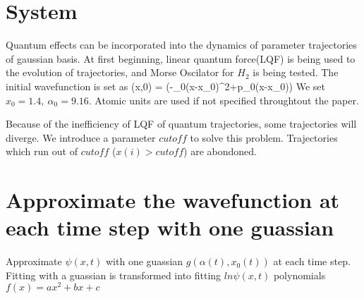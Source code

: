\documentclass[11pt]{article}
\begin{document}
\section{System}
Quantum effects can be incorporated into the dynamics of parameter trajectories of gaussian basis.
At first beginning, linear quantum force(LQF) is being used to the evolution of trajectories, and 
Morse Oscilator for $H_2$ is being tested. 
The initial wavefunction is set as 
\be \psi(x,0) = \exp(-\alpha_0(x-x_0)^2+\im p_0(x-x_0)) \ee 
We set $x_0 = 1.4,~ \alpha_0=9.16$. Atomic units are used if not specified throughtout the paper.

Because of the inefficiency of LQF of quantum trajectories, some trajectories will diverge. We introduce a parameter $cutoff$ to solve this problem. 
Trajectories which run out of $cutoff$ ($x(i) > cutoff$) are abondoned. 
  


%
%
%

\section{Approximate the wavefunction at each time step with one guassian}
Approximate $\psi(x,t)$ with one guassian $g(\alpha(t),x_0(t))$ at each time step. 
Fitting with a guassian is transformed into fitting $ln\psi(x,t)$ polynomials $f(x) = ax^2+bx+c$
\end{document}
